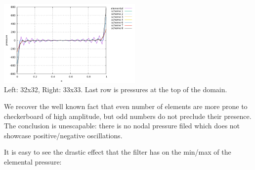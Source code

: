 \begin{center}
\includegraphics[width=7cm]{python_codes/fieldstone_12/results/ldc33/p_top}\\
{\captionfont Left: 32x32, Right: 33x33. Last row is pressures at the top of the domain.}
\end{center}

We recover the well known fact that even number of elements are more prone to 
checkerboard of high amplitude, but odd numbers do not preclude their presence.
The conclusion is unescapable: there is no nodal pressure filed which does not 
showcase positive/negative oscillations.


It is easy to see the drastic effect that the filter has on the min/max of the elemental pressure:

